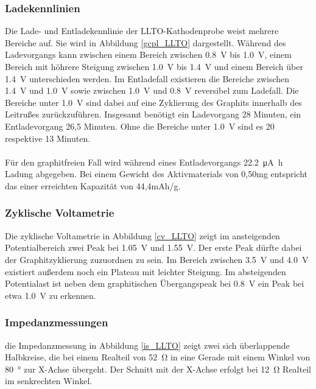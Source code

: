 \documentclass[a4paper, 11pt, headsepline,footsepline,twoside,abstract]{scrbook}
\begin{document}
\subsubsection{Ladekennlinien}
Die Lade- und Entladekennlinie der LLTO-Kathodenprobe weist mehrere Bereiche auf. Sie wird in Abbildung \ref{gcpl_LLTO} dargestellt. Während des Ladevorgangs kann zwischen einem Bereich zwischen \SI{0.8}{\volt} bis \SI{1.0}{\volt}, einem Bereich mit höhrere Steigung zwischen \SI{1.0}{\volt} bis \SI{1.4}{\volt} und einem Bereich über \SI{1.4}{\volt} unterschieden werden. Im Entladefall existieren die Bereiche zwischen \SI{1.4}{\volt} und \SI{1.0}{\volt} sowie zwischen \SI{1.0}{\volt} und \SI{0.8}{\volt} reversibel zum Ladefall. Die Bereiche unter \SI{1.0}{\volt} sind dabei auf eine Zyklierung des Graphits innerhalb des Leitrußes zurückzuführen. Insgesamt benötigt ein Ladevorgang 28 Minuten, ein Entladevorgang 26,5 Minuten. Ohne die Bereiche unter \SI{1.0}{\volt} sind es 20 respektive 13 Minuten.
\\\\
Für den graphitfreien Fall  wird während eines Entladevorgangs \SI{22.2}{\micro\ampere\hour} Ladung abgegeben. Bei einem Gewicht des Aktivmaterials von 0,50mg entspricht das einer erreichten Kapazität von 44,4mAh/g.
\subsubsection{Zyklische Voltametrie}
Die zyklische Voltametrie in Abbildung \ref{cv_LLTO} zeigt im ansteigenden Potentialbereich zwei Peak bei \SI{1.05}{\volt} und \SI{1.55}{\volt}. Der erste Peak dürfte dabei der Graphitzyklierung zuzuordnen zu sein.  Im Bereich zwischen \SI{3.5}{\volt} und \SI{4.0}{\volt} existiert außerdem noch ein Plateau mit leichter Steigung. Im absteigenden Potentialast ist neben dem graphitischen Übergangspeak bei \SI{0.8}{\volt} ein Peak bei etwa \SI{1.0}{\volt} zu erkennen.
\subsubsection{Impedanzmessungen}
die Impedanzmessung in Abbildung \ref{is_LLTO} zeigt zwei sich überlappende Halbkreise, die bei einem Realteil von \SI{52}{\ohm} in eine Gerade mit einem Winkel von \SI{80}{\degree} zur X-Achse übergeht. Der Schnitt mit der X-Achse erfolgt bei \SI{12}{\ohm} Realteil im senkrechten Winkel.
\newpage
\end{document}
